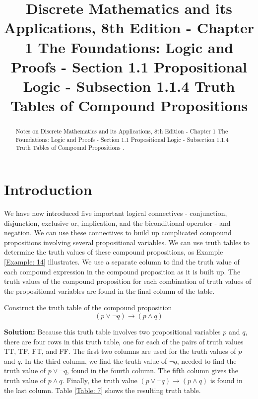 \documentclass{Axon}
\title{Discrete Mathematics and its Applications, 8th Edition - Chapter 1 The Foundations: Logic and Proofs - Section 1.1 Propositional Logic - Subsection 1.1.4 Truth Tables of Compound Propositions}
\begin{document}
\maketitle
\makeauthor
\begin{abstract}
Notes on Discrete Mathematics and its Applications, 8th Edition - Chapter 1 The Foundations: Logic and Proofs - Section 1.1 Propositional Logic - Subsection 1.1.4 Truth Tables of Compound Propositions \cite{Rosen}.
\end{abstract}
\section{Introduction}
We have now introduced five important logical connectives - conjunction, disjunction, exclusive or, implication, and the biconditional operator - and negation. We can use these connectives to build up complicated compound propositions involving several propositional variables. We can use truth tables to determine the truth values of these compound propositions, as Example \ref{Example: 14} illustrates. We use a separate column to find the truth value of each compound expression in the compound proposition as it is built up. The truth values of the compound proposition for each combination of truth values of the propositional variables are found in the final column of the table.

\begin{example}\label{Example: 14}
    Construct the truth table of the compound proposition
    \begin{equation*}
        (p \lor \lnot q) \to (p \land q)
    \end{equation*}

    \noindent
    \textbf{Solution:}
    Because this truth table involves two propositional variables \(p\) and \(q\), there are four rows in this truth table, one for each of the pairs of truth values TT, TF, FT, and FF. The first two columns are used for the truth values of \(p\) and \(q\). In the third column, we find the truth value of \(\lnot q\), needed to find the truth value of \(p \lor \lnot q\), found in the fourth column. The fifth column gives the truth value of \(p \land q\). Finally, the truth value \((p \lor \lnot q) \to (p \land q)\) is found in the last column. Table \ref{Table: 7} shows the resulting truth table.
\end{example}
\end{document}
